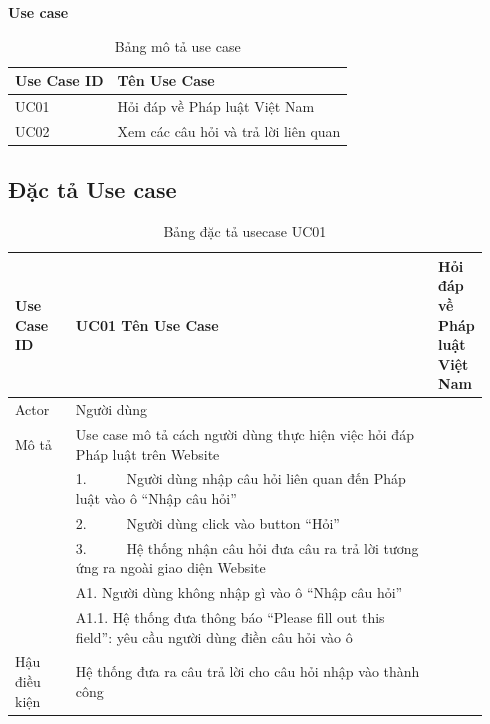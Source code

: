 \textbf{Use case }
\begin{table}[htp]
	\centering	
	\caption{Bảng mô tả use case}
	\begin{tabular}{|l|l|}
		\hline
		Use Case ID & Tên Use Case                         \\ \hline
		UC01        & Hỏi đáp về Pháp luật Việt Nam        \\ \hline
		UC02        & Xem các câu hỏi và trả lời liên quan \\ \hline
	\end{tabular}
	\label{tab:usecase}
\end{table}

\pagebreak
\subsection{Đặc tả Use case}

\begin{longtable}{|>{\hspace{0pt}}m{0.135\linewidth}|>{\hspace{0pt}}m{0.808\linewidth}|}
	\caption{Bảng đặc tả usecase UC01}\\ 
	\hline
	\textbf{Use Case ID} & \textbf{UC01} \endfirsthead 
	\hline
	Tên Use Case & Hỏi đáp về Pháp luật Việt Nam \\ 
	\hline
	Actor & Người dùng \\ 
	\hline
	Mô tả & Use case mô tả cách người dùng thực hiện việc hỏi đáp Pháp luật trên Website \\* 
	\hline
	 & 1.~~~~~ Người dùng nhập câu hỏi liên quan đến Pháp luật vào ô “Nhập câu hỏi” \\* 
	\cline{2-2}
	& 2.~~~~~ Người dùng click vào button “Hỏi” \\* 
	\cline{2-2}
	& 3.~~~~~ Hệ thống nhận câu hỏi đưa câu ra trả lời tương ứng ra ngoài giao diện Website \\* 
	\hline
	 & A1.  Người dùng không nhập gì vào ô “Nhập câu hỏi” \\* 
	& A1.1.  Hệ thống đưa thông báo “Please fill out this field”: yêu cầu người dùng điền câu hỏi vào ô \\ 
	\hline
	Hậu điều kiện & Hệ thống đưa ra câu trả lời cho câu hỏi nhập vào thành công \\
	\hline
\end{longtable}


